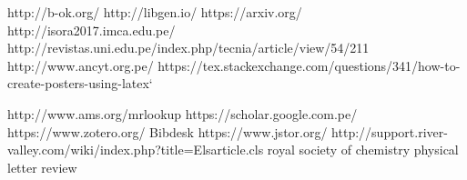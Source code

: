 http://b-ok.org/
http://libgen.io/
https://arxiv.org/
http://isora2017.imca.edu.pe/
http://revistas.uni.edu.pe/index.php/tecnia/article/view/54/211
http://www.ancyt.org.pe/
https://tex.stackexchange.com/questions/341/how-to-create-posters-using-latex`

\maketitle
\nocite{asterisk}



\listoftables
\tableofcontents
\listoffigures
\listfiles
http://www.ams.org/mrlookup
https://scholar.google.com.pe/
https://www.zotero.org/
Bibdesk
https://www.jstor.org/
http://support.river-valley.com/wiki/index.php?title=Elsarticle.cls
royal society of chemistry
physical letter review